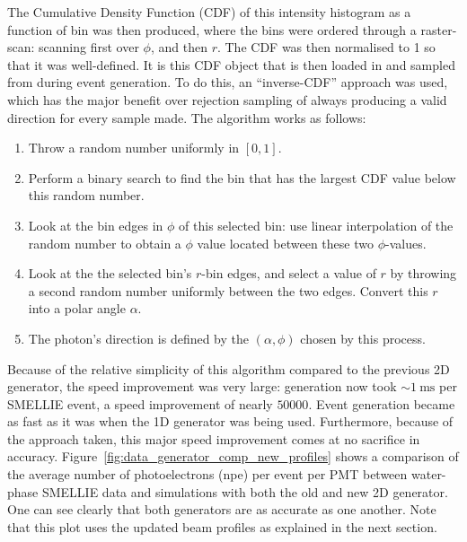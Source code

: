 The Cumulative Density Function (CDF) of this intensity histogram as a function of bin was then produced, where the bins were ordered through a raster-scan: scanning first over $\phi$, and then $r$. The CDF was then normalised to 1 so that it was well-defined. It is this CDF object that is then loaded in and sampled from during event generation. To do this, an ``inverse-CDF'' approach was used, which has the major benefit over rejection sampling of always producing a valid direction for every sample made. The algorithm works as follows:

\begin{enumerate}
    \item Throw a random number uniformly in $[0,1]$.
    \item Perform a binary search to find the bin that has the largest CDF value below this random number.
    \item Look at the bin edges in $\phi$ of this selected bin: use linear interpolation of the random number to obtain a $\phi$ value located between these two $\phi$-values.
    \item Look at the the selected bin's $r$-bin edges, and select a value of $r$ by throwing a second random number uniformly between the two edges. Convert this $r$ into a polar angle $\alpha$.
    \item The photon's direction is defined by the $(\alpha, \phi)$ chosen by this process. 
\end{enumerate}

Because of the relative simplicity of this algorithm compared to the previous 2D generator, the speed improvement was very large: generation now took $\sim\SI{1}{\milli\second}$ per SMELLIE event, a speed improvement of nearly $\num{50000}$. Event generation became as fast as it was when the 1D generator was being used. Furthermore, because of the approach taken, this major speed improvement comes at no sacrifice in accuracy. Figure~\ref{fig:data_generator_comp_new_profiles} shows a comparison of the average number of photoelectrons (npe) per event per PMT between water-phase SMELLIE data and simulations with both the old and new 2D generator. One can see clearly that both generators are as accurate as one another. Note that this plot uses the updated beam profiles as explained in the next section.

